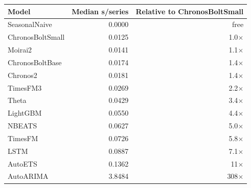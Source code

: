 \begin{tabular}{lrr}
\toprule
Model & Median s/series & Relative to ChronosBoltSmall \\
\midrule
SeasonalNaive & 0.0000 & free \\
ChronosBoltSmall & 0.0125 & 1.0$\times$ \\
Moirai2 & 0.0141 & 1.1$\times$ \\
ChronosBoltBase & 0.0174 & 1.4$\times$ \\
Chronos2 & 0.0181 & 1.4$\times$ \\
TimesFM3 & 0.0269 & 2.2$\times$ \\
Theta & 0.0429 & 3.4$\times$ \\
LightGBM & 0.0550 & 4.4$\times$ \\
NBEATS & 0.0627 & 5.0$\times$ \\
TimesFM & 0.0726 & 5.8$\times$ \\
LSTM & 0.0887 & 7.1$\times$ \\
AutoETS & 0.1362 & 11$\times$ \\
AutoARIMA & 3.8484 & 308$\times$ \\
\bottomrule
\end{tabular}
